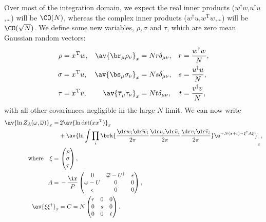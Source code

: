 \documentclass[12pt]{article}
\newcommand{\dg}{^\dagger}
\newcommand{\trans}{^\mathrm{T}}
\newcommand{\omb}{\overline{\omega}}
\newcommand{\bt}{\overline{\tau}}
\newcommand{\dw}{\dr w}
\newcommand{\dwb}{\dr\overline{w}}
\newcommand{\du}{\dr u}
\newcommand{\dub}{\dr\bar{u}}
\newcommand{\dv}{\dr v}
\newcommand{\dvb}{\dr\bar{v}}
\begin{document}
Over most of the integration domain, we expect the real inner products ($w\dg w$,$u\dg u$,\ldots) will be $\CO(N)$, whereas the complex inner products ($w\dg u$,$w\trans w$,\ldots) will be $\CO(\sqrt{N})$.
We define some new variables, $\rho,\sigma \text{ and } \tau$, which are zero mean Gaussian random vectors:
%
\begin{equation}\label{eq:rstdef}
\begin{aligned}
  \rho &= x\trans w ,
    & \av{\br_\mu \rho_\nu}_x &= Nr\delta_{\mu\nu} ,
    & r&=\frac{w\dg w}{N}, \\
  \sigma &= x\trans u ,
    & \av{\bs_\mu \sigma_\nu}_x &= Ns\delta_{\mu\nu} ,
    & s&=\frac{u\dg u}{N}, \\
  \tau &= x\trans v,
    & \av{\bt_\mu \tau_\nu}_x &= Nt\delta_{\mu\nu},
    & t&=\frac{v\dg v}{N}, \\
\end{aligned}
\end{equation}
%
with all other covariances negligible in the large $N$ limit.
We can now write
%
\begin{equation}\label{eq:potwuv}
\begin{aligned}
  \av{\ln Z_A(\omega,\omb)}_x =&\,  2\av{\ln\det(xx\trans)}_x
  \\&+
          \av{\ln\int \prod_i\brk{ \frac{\dw_i\dwb_i}{2\pi} \frac{\du_i\dub_i}{2\pi} \frac{\dv_i\dvb_i}{2\pi} } \e^{-N(s+t)-\xi\dg A \xi} }_{x} ,
  \\ \text{where}\quad
  \xi =&\, \begin{pmatrix}
           \rho \\
           \sigma \\
           \tau \\
         \end{pmatrix},
 \\
  A =&\, -\frac{\ir}{P}
       \begin{pmatrix}
         0        & \omb-U\dg & \epsilon \\
         \omega-U & 0            & 0 \\
         \epsilon & 0            & 0 \\
       \end{pmatrix},\\
  \av{\xi\xi\dg}_x &=  C = N\begin{pmatrix}
         r & 0 & 0 \\
         0 & s & 0 \\
         0 & 0 & t \\
       \end{pmatrix}.
\end{aligned}
\end{equation}
\end{document}
